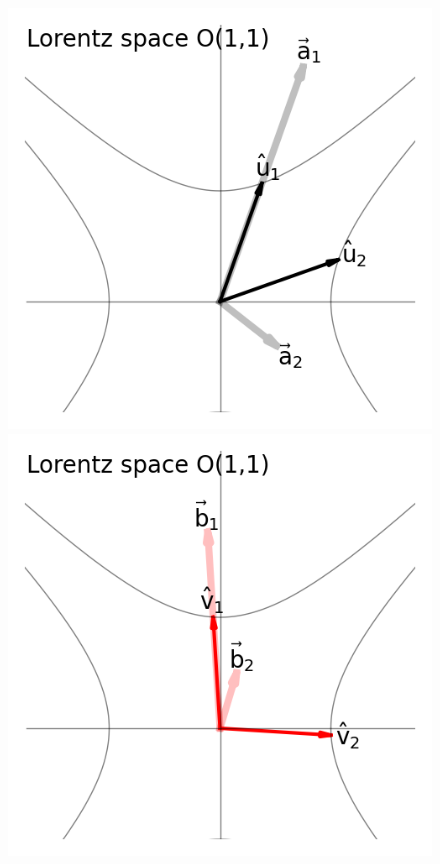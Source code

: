 \documentclass{article}
\newlength{\figurewidth}
\begin{document}
\begin{figure}[t]
\begin{mdframed}
\includegraphics[width=\figurewidth]{L_v.png}%
\includegraphics[width=\figurewidth]{L_vp.png}%

\end{mdframed}
\end{figure}
\end{document}
